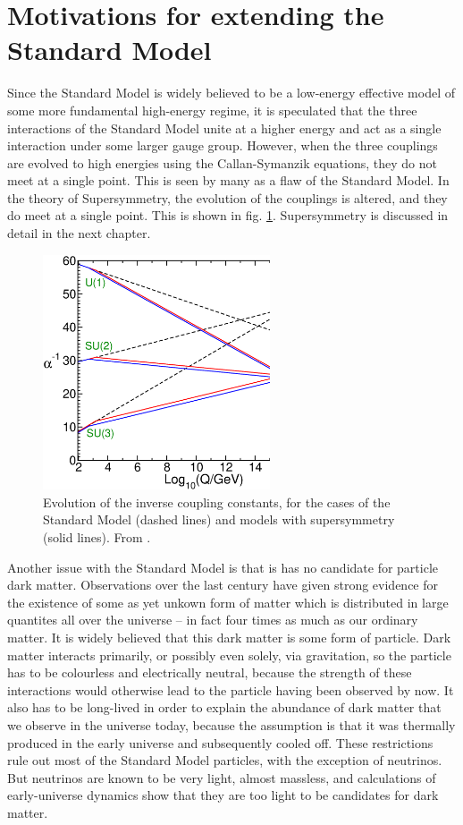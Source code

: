 \documentclass[twoside,english]{uiofysmaster}
\begin{document}
\section{Motivations for extending the Standard Model}

Since the Standard Model is widely believed to be a low-energy effective model of some more fundamental high-energy regime, it is speculated that the three interactions of the Standard Model unite at a higher energy and act as a single interaction under some larger gauge group. However, when the three couplings are evolved to high energies using the Callan-Symanzik equations, they do not meet at a single point. This is seen by many as a flaw of the Standard Model. In the theory of Supersymmetry, the evolution of the couplings is altered, and they do meet at a single point. This is shown in fig. \ref{fig:coupling_unification}. Supersymmetry is discussed in detail in the next chapter.
\begin{figure}[hbt]
	\centering
	\includegraphics[width=0.6\textwidth]{figures/susyintro/unification.eps}
	\caption{Evolution of the inverse coupling constants, for the cases of the Standard Model (dashed lines) and models with supersymmetry (solid lines). From \cite{Martin:1997ns}.}
	\label{fig:coupling_unification}
\end{figure}

Another issue with the Standard Model is that is has no candidate for particle dark matter. Observations over the last century have given strong evidence for the existence of some as yet unkown form of matter which is distributed in large quantites all over the universe -- in fact four times as much as our ordinary matter. It is widely believed that this dark matter is some form of particle. Dark matter interacts primarily, or possibly even solely, via gravitation, so the particle has to be colourless and electrically neutral, because the strength of these interactions would otherwise lead to the particle having been observed by now. It also has to be long-lived in order to explain the abundance of dark matter that we observe in the universe today, because the assumption is that it was thermally produced in the early universe and subsequently cooled off. These restrictions rule out most of the Standard Model particles, with the exception of neutrinos. But neutrinos are known to be very light, almost massless, and calculations of early-universe dynamics show that they are too light to be candidates for dark matter. 
\end{document}
